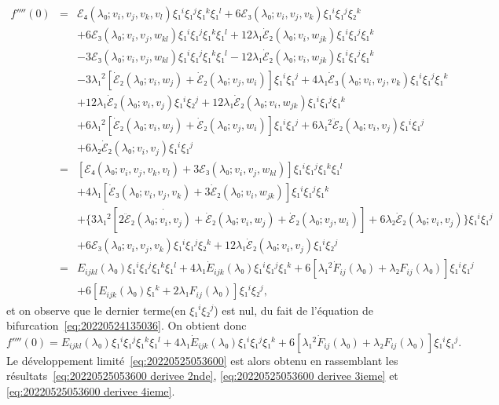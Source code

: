 \documentclass[12pt, final]{amsart}
\theoremstyle{definition}
\begin{document}
\begin{eqnarray*}
 f''''(0) & = & ℰ₄(λ₀; v_i, v_j, v_k {, v_l} ) ξ₁^i
 ξ₁^j ξ₁^k ξ₁^l + 6ℰ₃(λ₀; v_i, v_j, v_k) ξ₁^i
 ξ₁^j ξ₂^k\\
 & & + 6ℰ₃(λ₀; v_i, v_j, w_{k l})
 ξ₁^i ξ₁^j ξ₁^k ξ₁^l + 12 λ₁ \dot{ℰ}₂
 (λ₀; v_{i }, w_{j k}) ξ₁^i ξ₁^j ξ₁^k\\
 & & - 3ℰ₃(λ₀; v_i, v_j, w_{k l})
 ξ₁^i ξ₁^j ξ₁^k ξ₁^l - 12 λ₁ \dot{ℰ}₂
 (λ₀; v_i, w_{j k}) ξ₁^i ξ₁^j ξ₁^k\\
 & & - 3 λ₁^2 [\dot{ℰ}₂(λ₀; v_i, w_j)
 + \dot{ℰ}₂(λ₀; v_j, w_i)] ξ₁^i ξ₁^j + 4 λ₁
 \dot{ℰ}₃(λ₀; v_i, v_j, v_k) ξ₁^i ξ₁^j ξ₁^k\\
 & & + 12 λ₁ \dot{ℰ}₂(λ₀; v_i,
 v_j) ξ₁^i ξ₂^j + 12 λ₁ \dot{ℰ}₂(λ₀ ;
 v_i, w_{j k}) ξ₁^i ξ₁^j ξ₁^k\\
 & & + 6 λ₁^2 [\dot{ℰ}₂(λ₀; v_i,
 w_j) + \dot{ℰ}₂(λ₀; v_j, w_i)] ξ₁^i ξ₁^j + 6
 λ₁^2 \ddot{ℰ}₂(λ₀; v_i, v_j) ξ₁^i ξ₁^j\\
 & & + 6 λ₂ \dot{ℰ}₂(λ₀; v_i, v_j)
 ξ₁^i ξ₁^j\\
 & = & \left[ ℰ₄(λ₀; v_i, v_j, v_k {, v_l} ) +
 3ℰ₃(λ₀; v_i, v_j, w_{k l}) \right] ξ₁^i
 ξ₁^j ξ₁^k ξ₁^l\\
 & & + 4 λ₁ [\dot{ℰ}₃(λ₀; v_i, v_j,
 v_k) + 3 \dot{ℰ}₂(λ₀; v_i, w_{j k})] ξ₁^i
 ξ₁^j ξ₁^k\\
 & & + \{ 3 λ₁^2 [\dot{2 \ddot{ℰ}₂
 (λ₀; v_i, v_j) + \dot{ℰ}}₂(λ₀; v_i, w_j) +
 \dot{ℰ}₂(λ₀; v_j, w_i)] + 6 λ₂
 \dot{ℰ}₂(λ₀; v_i, v_j) \} ξ₁^i ξ₁^j\\
 & & + 6ℰ₃(λ₀; v_i, v_j, v_k) ξ₁^i ξ₁^j
 ξ₂^k + 12 λ₁ \dot{ℰ}₂(λ₀; v_i, v_j)
 ξ₁^i ξ₂^j\\
 & = & E_{i j k l}(λ₀) ξ₁^i ξ₁^j
 ξ₁^k ξ₁^l + 4 λ₁ \dot{E}_{i j k}
 (λ₀) ξ₁^i ξ₁^j ξ₁^k + 6 [λ₁^2 \dot{F}_{i
  j}(λ₀) + λ₂ F_{i j}(λ₀)]
 ξ₁^i ξ₁^j\\
 & & + 6 [E_{i j k}(λ₀) ξ₁^k + 2
 λ₁ F_{i j}(λ₀)] ξ₁^i ξ₂^j,
\end{eqnarray*}
et on observe que le dernier terme(en \(ξ₁^i ξ₂^j\)) est nul, du fait de l'équation de bifurcation~\eqref{eq:20220524135036}. On obtient donc
\begin{equation}
 \label{eq:20220525053600 derivee 4ieme} f''''(0) = E_{i j k
  l}(λ₀) ξ₁^i ξ₁^j ξ₁^k ξ₁^l + 4 λ₁
 \dot{E}_{i j k}(λ₀) ξ₁^i ξ₁^j ξ₁^k + 6
 [λ₁^2 \dot{F}_{i j}(λ₀) + λ₂ F_{i
  j}(λ₀)] ξ₁^i ξ₁^j .
\end{equation}
Le développement limité~\eqref{eq:20220525053600} est alors obtenu en rassemblant les résultats~\eqref{eq:20220525053600 derivee 2nde}, \eqref{eq:20220525053600 derivee 3ieme} et \eqref{eq:20220525053600 derivee 4ieme}.
\end{document}
